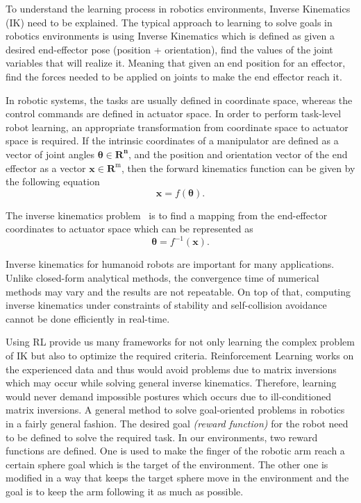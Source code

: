 To understand the learning process in robotics environments, Inverse Kinematics (IK) need to be explained. The typical approach to learning to solve goals in robotics environments is using Inverse Kinematics which is defined as given a desired end-effector pose (position + orientation), find the values of the joint variables that will realize it. Meaning that given an end position for an effector, find the forces needed to be applied on joints to make the end effector reach it.

In robotic systems, the tasks are usually defined in coordinate space, whereas the control commands are defined in actuator space. In order to perform task-level robot learning, an appropriate transformation from coordinate space to actuator space is required. If the intrinsic coordinates of a manipulator are defined as a vector of joint angles \(\boldsymbol{\theta} \in \mathbf{R}^{\mathbf{n}}\), and the position and orientation vector of the end effector as a vector \(\mathbf{x} \in \mathbf{R}^{\mathrm{m}}\), then the forward kinematics function can be given by the following equation 
\begin{equation}
	        \mathbf{x}=f(\boldsymbol{\theta}).
\end{equation}

The inverse kinematics problem~\parencite{colome2011smooth, chua2013robust} is to find a mapping from the end-effector coordinates to actuator space which can be represented as
\begin{equation}
	        \boldsymbol{\theta}=f^{-1}(\mathbf{x}).
\end{equation}

Inverse kinematics for humanoid robots are important for many applications. Unlike closed-form analytical methods, the convergence time of numerical methods may vary and the results are not repeatable. On top of that, computing inverse kinematics under constraints of stability and self-collision avoidance cannot be done efficiently in real-time.

Using RL provide us many frameworks for not only learning the complex problem of IK but also to optimize the required criteria. Reinforcement Learning works on the experienced data and thus would avoid problems due to matrix inversions which may occur while solving general inverse kinematics. Therefore, learning would never demand impossible postures which occurs due to ill-conditioned matrix inversions. A general method to solve goal-oriented problems in robotics in a fairly general fashion. The desired goal \textit{(reward function)} for the robot need to be defined to solve the required task. In our environments, two reward functions are defined. One is used to make the finger of the robotic arm reach a certain sphere goal which is the target of the environment. The other one is modified in a way that keeps the target sphere move in the environment and the goal is to keep the arm following it as much as possible. 



